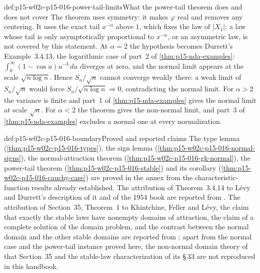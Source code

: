 \begin{hbwarning}{def:p15-w02c-p15-016-power-tail-limits}{What the power-tail theorem does and does not cover}
The theorem uses symmetry: it makes \(\varphi\) real and removes any
centering. It uses the exact tail \(x^{-\alpha}\) above \(1\), which
fixes the law of \(|X_1|\); a law whose tail is only asymptotically
proportional to \(x^{-\alpha}\), or an asymmetric law, is not covered
by this statement. At \(\alpha=2\) the hypothesis becomes Durrett's
Example~3.4.13, the logarithmic case of part~2 of
\cref{thm:p15-nda-examples}: \(\int_0^\infty(1-\cos u)u^{-3}\,du\)
diverges at zero, and the normal limit appears at the scale
\(\sqrt{n\log n}\). Hence \(S_n/\sqrt n\) cannot converge weakly
there: a weak limit of \(S_n/\sqrt n\) would force
\(S_n/\sqrt{n\log n}\Rightarrow0\), contradicting the normal limit. For \(\alpha>2\) the variance is
finite and part~1 of \cref{thm:p15-nda-examples} gives the normal
limit at scale \(\sqrt n\). For \(\alpha<2\) the theorem gives the
non-normal limit, and part~3 of \cref{thm:p15-nda-examples} excludes a
normal one at every normalization.
\end{hbwarning}

\begin{proofboundary}{def:p15-w02c-p15-016-boundary}{Proved and reported claims}
The type lemma (\cref{thm:p15-w02c-p15-016-types}), the sign
lemma (\cref{thm:p15-w02c-p15-016-normal-signs}), the normal-attraction
theorem (\cref{thm:p15-w02c-p15-016-gk-normal}), the power-tail
theorem (\cref{thm:p15-w02c-p15-016-stable}) and its
corollary (\cref{thm:p15-w02c-p15-016-cauchy-case}) are proved in the annex from
the characteristic-function results already established. The
attribution of Theorem~3.4.14 to L\'evy and Durrett's description of
it and of the 1954 book are reported from
\cite[p.~152]{DurrettPTEAuthor2019}. The attribution of
Section~35, Theorem~1 to Khintchine, Feller and L\'evy, the claim that
exactly the stable laws have nonempty domains of attraction, the claim
of a complete solution of the domain problem, and the contrast between
the normal domain and the other stable domains are reported from
\cite[p.~172]{GnedenkoKolmogorov1954LimitDistributions}; apart from
the normal case and the power-tail instance proved here, the
non-normal domain theory of that Section~35 and the stable-law
characterization of its \S\,33 are not reproduced in this handbook.
\end{proofboundary}
